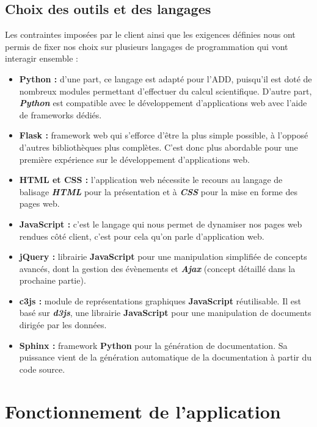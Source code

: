 		\subsection{Choix des outils et des langages}
		Les contraintes imposées par le client ainsi que les exigences définies nous ont permis de fixer nos choix sur plusieurs langages de programmation qui vont interagir ensemble : 
		\begin{itemize}[leftmargin=*]
			\item \textbf{Python :} d'une part, ce langage est adapté pour l'ADD, puisqu'il est doté de nombreux modules permettant d'effectuer du calcul scientifique. D'autre part, \textbf{\textit{Python}} est compatible avec le développement d’applications web avec l'aide de frameworks dédiés.
			\item \textbf{Flask :} framework web qui s’efforce d’être la plus simple possible, à l'opposé d'autres bibliothèques plus complètes. C'est donc plus abordable pour une première expérience sur le développement d'applications web.
			\item \textbf{HTML et CSS :} l'application web nécessite le recours au langage de balisage \textbf{\textit{HTML}} pour la présentation et à \textbf{\textit{CSS}} pour la mise en forme des pages web.
			\item \textbf{JavaScript :} c'est le langage qui nous permet de dynamiser nos pages web rendues côté client, c'est pour cela qu'on parle d'application web.
			\item \textbf{jQuery :} librairie \textbf{JavaScript} pour une manipulation simplifiée de concepts avancés, dont la gestion des évènements et \textbf{\textit{Ajax}} (concept détaillé dans la prochaine partie).
			\item \textbf{c3js :} module de représentations graphiques \textbf{JavaScript} réutilisable. Il est basé sur \textbf{\textit{d3js}}, une librairie \textbf{JavaScript} pour une manipulation de documents dirigée par les données.
			\item \textbf{Sphinx :} framework \textbf{Python} pour la génération de documentation. Sa puissance vient de la génération automatique de la documentation à partir du code source.
		\end{itemize}
		
			
	\section{Fonctionnement de l'application}

